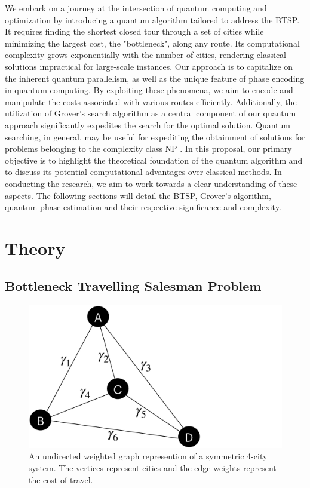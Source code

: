 \documentclass[twocolumn,showpacs,preprintnumbers,amsmath,amssymb]{revtex4}
\begin{document}
		We embark on a journey at the intersection of quantum computing and optimization by introducing a quantum algorithm tailored to address the BTSP. It requires finding the shortest closed tour through a set of cities while minimizing the largest cost, the "bottleneck", along any route. Its computational complexity grows exponentially with the number of cities, rendering classical solutions impractical for large-scale instances. Our approach is to capitalize on the inherent quantum parallelism, as well as the unique feature of phase encoding in quantum computing. By exploiting these phenomena, we aim to encode and manipulate the costs associated with various routes efficiently. Additionally, the utilization of Grover's search algorithm as a central component of our quantum approach significantly expedites the search for the optimal solution.  Quantum searching, in general, may be useful for expediting the obtainment of solutions for problems belonging to the complexity class NP \cite{nielsen00}. In this proposal, our primary objective is to highlight the theoretical foundation of the quantum algorithm and to discuss its potential computational advantages over classical methods. In conducting the research, we aim to work towards a clear understanding of these aspects. The following sections will detail the BTSP, Grover's algorithm, quantum phase estimation and their respective significance and complexity. 
		
		
		\section{Theory}
		
		\subsection{Bottleneck Travelling Salesman Problem}
		
		\begin{figure}[!h]
			\centering
			\includegraphics[trim={0 0 21.9cm 0},clip, width=0.7 \linewidth]{"graphics/4-city"}
			\caption{An undirected weighted graph represention of a  symmetric 4-city system.  The vertices represent cities and the edge weights represent the cost of travel. }
			\label{fig:4-city-graphic}
		\end{figure}		
		
\end{document}
